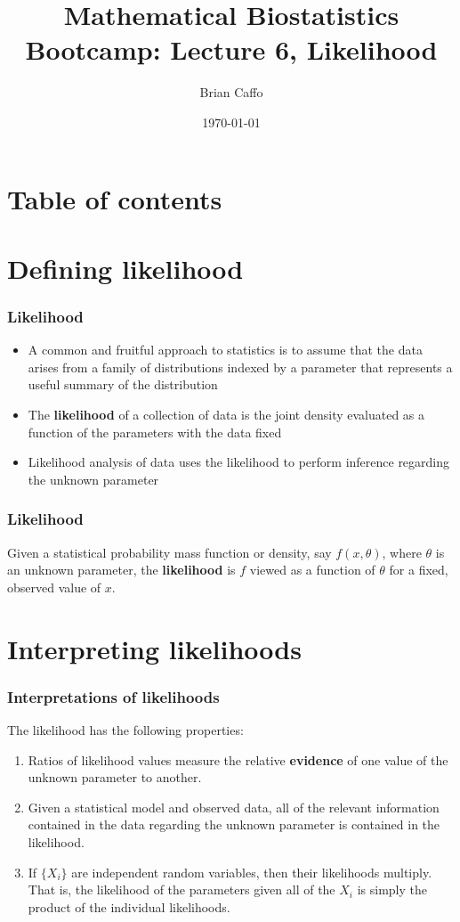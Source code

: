 \documentclass[aspectratio=169]{beamer}
\title{Mathematical Biostatistics Bootcamp: Lecture 6, Likelihood}
\author{Brian Caffo}
\date{\today}
\institute[Department of Biostatistics]{
  Department of Biostatistics \\
  Johns Hopkins Bloomberg School of Public Health\\
  Johns Hopkins University
}
\begin{document}
\frame{\titlepage}


\section{Table of contents}


\section{Defining likelihood}
\begin{frame}\frametitle{Likelihood}
\begin{itemize}
\item A common and fruitful approach to statistics is to assume that
  the data arises from a family of distributions indexed by a
  parameter that represents a useful summary of the distribution
\item The {\bf likelihood} of a collection of data is the joint
  density evaluated as a function of the parameters with the data fixed
\item Likelihood analysis of data uses the likelihood to perform inference
  regarding the unknown parameter
\end{itemize}
\end{frame}

\begin{frame}\frametitle{Likelihood}
  Given a statistical probability mass function or density, say $f(x,
  \theta)$, where $\theta$ is an unknown parameter, the {\bf likelihood}
  is $f$ viewed as a function of $\theta$ for a fixed, observed value of
  $x$. 
\end{frame}

\section{Interpreting likelihoods}
\begin{frame}\frametitle{Interpretations of likelihoods}
The likelihood has the following properties:
  \begin{enumerate}
  \item Ratios of likelihood values measure the relative {\bf
      evidence} of one value of the unknown parameter to another.
  \item Given a statistical model and observed data, all of the relevant
    information contained in the data regarding the unknown parameter is
    contained in the likelihood.
  \item If $\{X_i\}$ are independent random variables, then their likelihoods
    multiply.  That is, the likelihood of the parameters given all of
    the $X_i$ is simply the product of the individual likelihoods.
  \end{enumerate}
\end{frame}
\end{document}
